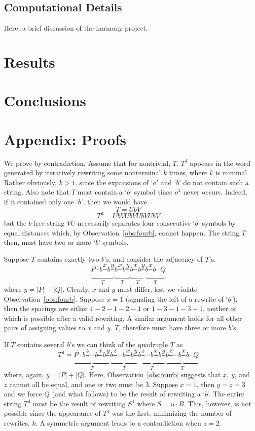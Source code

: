 \documentclass[11pt]{article}
\def\ni{\noindent}
\def\s#1{\frac{#1}{}}
\def\q#1{`$#1$'}
\begin{document}
\subsection{Computational Details}
Here, a brief discussion of the harmony project.

\section{Results}\label{sect:results}

\section{Conclusions}\label{sect:conclusions}
\section*{Appendix: Proofs}\label{app:proofs}
\ni{\bf Proof of Lemma~\ref{lemma:p4}.} We prove by contradiction.  Assume that for nontrivial, $T$, $T^4$ appears
in the word generated by iteratively rewriting some nonterminal $k$ times, where $k$ is minimal.
Rather obviously, $k>1$, since the expansions of \q{a} and \q{b} do not contain
such a string.  Also note that $T$ must contain a \q{b} symbol since $a^4$ never
occurs.  Indeed, if it contained only one \q{b}, then we would have
 $$T=UbV$$
 $$T^4=UbVUbVUbVUbV$$
\ni but the $b$-free string $VU$ necessarily separates four consecutive \q{b} symbols
by equal distances which, by Observation~\ref{obs:fourb}, cannot happen.  The string $T$ then, must have
two or more \q{b} symbols.

Suppose $T$ contains exactly two $b$'s, and consider the adjacency of $T$'s.
$$\underbrace{P\cdot b\s{x}b\s{y} }_T\underbrace{b\s{x}b\s{y} }_T\underbrace{b\s{x}b\s{y} }_T\underbrace{b\s{x}b\cdot Q}_T$$
\ni where $y=|P|+|Q|$.  Clearly, $x$ and $y$ must differ, lest we violate Observation~\ref{obs:fourb}.  
Suppose $x=1$ (signaling the left of a rewrite of \q{b}), then the spacings are either $1-2-1-2-1$ or
$1-3-1-3-1$, neither of which is possible after a valid rewriting.  A similar argument holds for all other
pairs of assigning values to $x$ and $y$.  $T$, therefore must have three or more $b$'s.

If $T$ contains several $b$'s we can think of the quadruple $T$ as
$$T^4=\underbrace{P\cdot b\s{z}\cdots b\s{x}b\s{y} }_T\underbrace{b\s{z}\cdots
  b\s{x}b\s{y} }_T\underbrace{b\s{z}\cdots b\s{x}b\s{y}
}_T\underbrace{b\s{z}\cdots b\s{x}b\cdot Q}_T$$ \ni where, again, $y=|P|+|Q|$.
Here, Observation~\ref{obs:fourb} suggests that $x$, $y$, and $z$ cannot all
be equal, and one or two must be $3$.  Suppose $x=1$, then $y=z=3$ and we
force $Q$ (and what follows) to be the result of rewriting a \q{b}.  The entire
string $T^4$ must be the result of rewriting $S^4$ where $S=u\cdot B$.  This,
however, is not possible since the appearance of $T^4$ was the first,
minimizing the number of rewrites, $k$.  A symmetric argument leads to a
contradiction when $z=2$.
\end{document}
